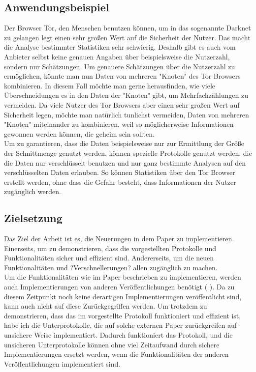 \documentclass[a4paper,10pt]{scrartcl}
\begin{document}
\subsection{Anwendungsbeispiel}
Der Browser Tor, den Menschen benutzen können, um in das sogenannte Darknet zu gelangen legt einen sehr großen Wert auf die Sicherheit der Nutzer. Das macht die Analyse bestimmter Statistiken sehr schwierig. Deshalb gibt es auch vom Anbieter selbst keine genauen Angaben über beispielsweise die Nutzerzahl, sondern nur Schätzungen. Um genauere Schätzungen über die Nutzerzahl zu ermöglichen, könnte man nun Daten von mehreren "Knoten" des Tor Browsers kombinieren. In diesem Fall möchte man gerne herausfinden, wie viele Überschneidungen es in den Daten der "Knoten" gibt, um Mehrfachzählungen zu vermeiden. Da viele Nutzer des Tor Browsers aber einen sehr großen Wert auf Sicherheit legen, möchte man natürlich tunlichst vermeiden, Daten von mehreren "Knoten" miteinander zu kombinieren, weil so möglicherweise Informationen gewonnen werden können, die geheim sein sollten.\\
Um zu garantieren, dass die Daten beispielsweise nur zur Ermittlung der Größe der Schnittmenge genutzt werden, können spezielle Protokolle genutzt werden, die die Daten nur verschlüsselt benutzen und nur ganz bestimmte  Analysen auf den verschlüsselten Daten erlauben. So können Statistiken über den Tor Browser erstellt werden, ohne dass die Gefahr besteht, dass Informationen der Nutzer zugänglich werden.


\subsection{Zielsetzung}
Das Ziel der Arbeit ist es, die Neuerungen in dem Paper \cite{Doettling2021} zu implementieren. Einerseits, um zu demonstrieren, dass die vorgestellten Protokolle und Funktionalitäten sicher und effizient sind. Andererseits, um die neuen Funktionalitäten und ?Verschnellerungen? allen zugänglich zu machen.\\
Um die Funktionalitäten wie im Paper \cite{Doettling2021} beschrieben zu implementieren, werden auch Implementierungen von anderen Veröffentlichungen benötigt (\cite{paar andere} ). Da zu diesem Zeitpunkt noch keine derartigen Implementierungen veröffentlicht sind, kann auch nicht auf diese Zurückgegriffen werden. Um trotzdem zu demonstrieren, dass das im \cite{Doettling2021} vorgestellte Protokoll funktioniert und effizient ist, habe ich die Unterprotokolle, die auf solche externen Paper zurückgreifen auf unsichere Weise implementiert. Dadurch funktioniert das Protokoll, und die unsicheren Unterprotokolle können ohne viel Zeitaufwand durch sichere Implementierungen ersetzt werden, wenn die Funktionalitäten der anderen Veröffentlichungen implementiert sind.
\end{document}
